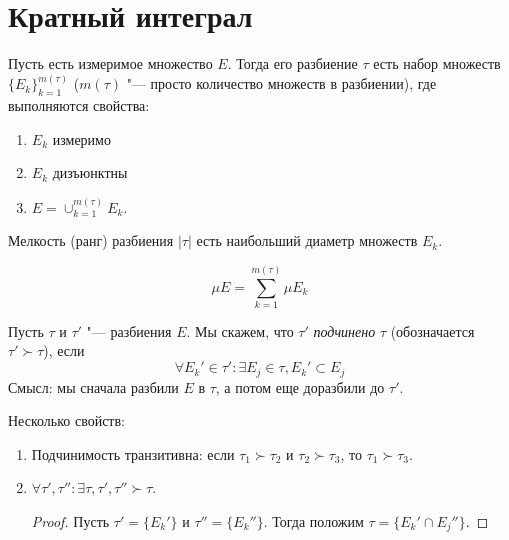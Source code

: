 \section{Кратный интеграл}
\begin{Def}
	Пусть есть измеримое множество $E$.
	Тогда его разбиение $\tau$ есть набор множеств $\{ E_k \}_{k=1}^{m(\tau)}$ ($m(\tau)$ "--- просто количество множеств в разбиении), где выполняются свойства:
	\begin{enumerate}
	\item $E_k$ измеримо
	\item $E_k$ дизъюнктны
	\item $E=\cup_{k=1}^{m(\tau)} E_k$.
	\end{enumerate}
\end{Def}
\begin{Def}
	Мелкость (ранг) разбиения $|\tau|$ есть наибольший диаметр множеств $E_k$.
\end{Def}
\begin{Rem}\label{riemann_measure_sum}
	\[ \mu E = \sum_{k=1}^{m(\tau)} \mu E_k \]
\end{Rem}
\begin{Def}
	Пусть $\tau$ и $\tau'$ "--- разбиения $E$.
	Мы скажем, что $\tau'$ \textit{подчинено} $\tau$ (обозначается $\tau' \succ \tau$), если
	\[
		\forall E_k' \in \tau' \colon \exists E_j \in \tau, E_k' \subset E_j
	\]
	Смысл: мы сначала разбили $E$ в $\tau$, а потом еще доразбили до $\tau'$.
\end{Def}

Несколько свойств:
\begin{enumerate}
\item Подчинимость транзитивна: если $\tau_1 \succ \tau_2$ и $\tau_2 \succ \tau_3$, то $\tau_1 \succ \tau_3$.
\item
	$\forall \tau', \tau'' \colon \exists \tau, \tau', \tau'' \succ \tau$.
	\begin{proof}
		Пусть $\tau'=\{E_k'\}$ и $\tau''=\{E_k''\}$.
		Тогда положим $\tau=\{E_k' \cap E_j''\}$.
	\end{proof}
\end{enumerate}

